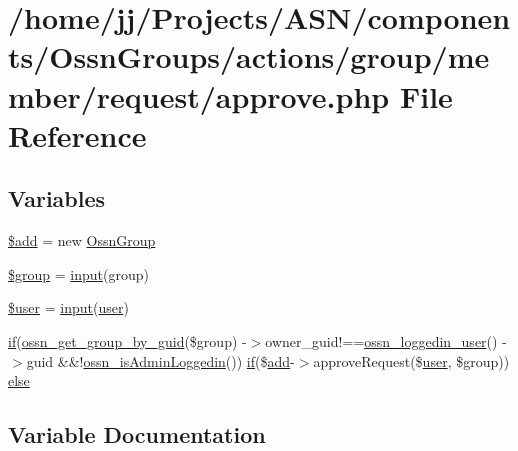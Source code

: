 \hypertarget{approve_8php}{}\section{/home/jj/\+Projects/\+A\+S\+N/components/\+Ossn\+Groups/actions/group/member/request/approve.php File Reference}
\label{approve_8php}
\subsection*{Variables}
\begin{DoxyCompactItemize}
\item 
\hyperlink{approve_8php_a76aeb354fc71a358526ea9fbd7aae7a4}{\$add} = new \hyperlink{class_ossn_group}{Ossn\+Group}
\item 
\hyperlink{approve_8php_ad530a85733b0ec1dc321859fd8faa0dc}{\$group} = \hyperlink{ossn_8lib_8input_8php_a64ebee98b041c4f75f71ed3cd73cc8ed}{input}(\textquotesingle{}group\textquotesingle{})
\item 
\hyperlink{approve_8php_a598ca4e71b15a1313ec95f0df1027ca5}{\$user} = \hyperlink{ossn_8lib_8input_8php_a64ebee98b041c4f75f71ed3cd73cc8ed}{input}(\textquotesingle{}\hyperlink{ossn_8config_8db_8example_8php_a802544b7ba9f79bbf24ef67773d53bed}{user}\textquotesingle{})
\item 
\hyperlink{jquery_8tokeninput_8js_ad8dd46a3cbc004569e34401e9e71771a}{if}(\hyperlink{libraries_2groups_8php_a134232596460947e7923a5ec7b255375}{ossn\+\_\+get\+\_\+group\+\_\+by\+\_\+guid}(\$group) -\/$>$owner\+\_\+guid!==\hyperlink{ossn_8lib_8users_8php_aa3c8068d0e6638b414d6a2f6c62565b8}{ossn\+\_\+loggedin\+\_\+user}() -\/$>$guid \&\&!\hyperlink{ossn_8lib_8users_8php_abf45a4c659ffd196160e8173c2af1106}{ossn\+\_\+is\+Admin\+Loggedin}()) \hyperlink{jquery_8tokeninput_8js_ad8dd46a3cbc004569e34401e9e71771a}{if}(\$\hyperlink{theme_8min_8js_a79ed6f45c867c160601f70dfa5ec2f95}{add}-\/$>$approve\+Request(\$\hyperlink{ossn_8config_8db_8example_8php_a802544b7ba9f79bbf24ef67773d53bed}{user}, \$group)) \hyperlink{approve_8php_a6a63f63af2bb7cc0d6ded8376d64ae44}{else}
\end{DoxyCompactItemize}


\subsection{Variable Documentation}
